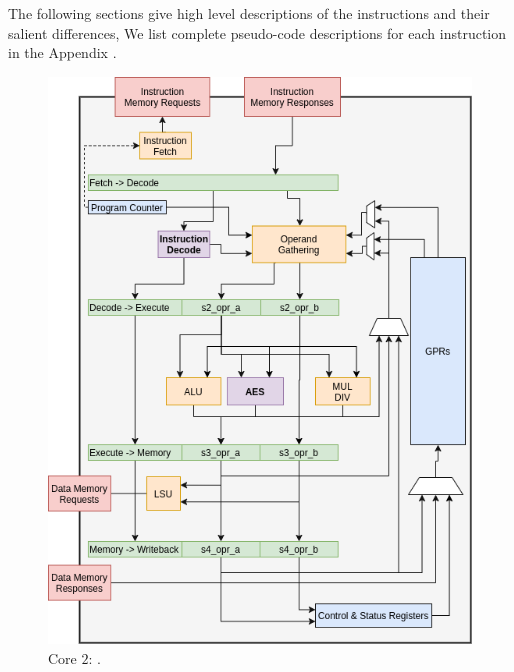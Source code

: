 The following sections give high level descriptions of the
instructions and their salient differences,
We list complete pseudo-code descriptions for each instruction
in the Appendix .

\begin{figure}
\centering
\includegraphics[scale=0.45,angle=90]{diagrams/scarv-cpu-uarch.png}
\caption{Core $2$: .}
\label{fig:design:cpu_block:2}
\end{figure}
